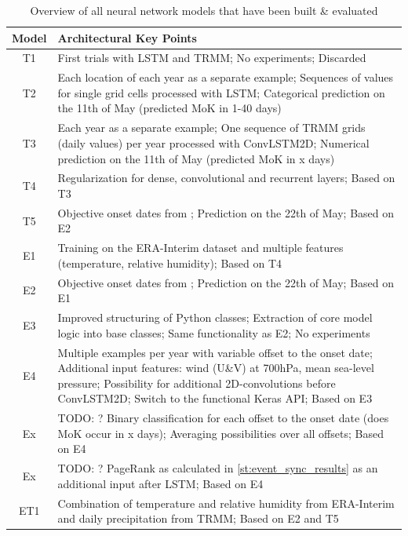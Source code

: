 \begin{table}[h]
  \begin{tabularx}{\linewidth}{|c|X|}
    \hline
    Model & Architectural Key Points \\
    \hline
    T1 & First trials with LSTM and TRMM; No experiments; Discarded \\
    T2 & Each location of each year as a separate example; Sequences of values for single grid cells processed with LSTM; Categorical prediction on the 11th of May (predicted MoK in 1-40 days) \\
    T3 & Each year as a separate example; One sequence of TRMM grids (daily values) per year processed with ConvLSTM2D; Numerical prediction on the 11th of May (predicted MoK in x days) \\
    T4 & Regularization for dense, convolutional and recurrent layers; Based on T3 \\
    T5 & Objective onset dates from \citep{Singh.2009}; Prediction on the 22th of May; Based on E2 \\
    \hline
    E1 & Training on the ERA-Interim dataset and multiple features (temperature, relative humidity); Based on T4 \\
    E2 & Objective onset dates from \citep{Singh.2009}; Prediction on the 22th of May; Based on E1 \\
    E3 & Improved structuring of Python classes; Extraction of core model logic into base classes; Same functionality as E2; No experiments \\
    E4 & Multiple examples per year with variable offset to the onset date; Additional input features: wind (U\&V) at 700hPa, mean sea-level pressure; Possibility for additional 2D-convolutions before ConvLSTM2D; Switch to the functional Keras API; Based on E3 \\
    Ex & TODO: ? Binary classification for each offset to the onset date (does MoK occur in x days); Averaging possibilities over all offsets; Based on E4 \\
    Ex & TODO: ? PageRank as calculated in \cref{st:event_sync_results} as an additional input after LSTM; Based on E4 \\
    \hline
    ET1 & Combination of temperature and relative humidity from ERA-Interim and daily precipitation from TRMM; Based on E2 and T5 \\
    \hline
  \end{tabularx}
  \caption{Overview of all neural network models that have been built \& evaluated}
  \label{tab:nn_overall_summary}
\end{table}


